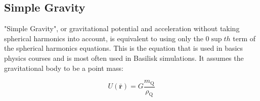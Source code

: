 \subsection{Simple Gravity}
"Simple Gravity", or gravitational potential and acceleration without taking spherical harmonics into account, is equivalent to using only the $0\sup{th}$ term of the spherical harmonics equations. This is the equation that is used in basics physics courses and is most often used in Basilisk simulations. It assumes the gravitational body to be a point mass:

\begin{equation}
U(\mathbf{\bar r}) = G \frac{ m_\text{Q}}{\rho_\text{Q}}
\end{equation}
